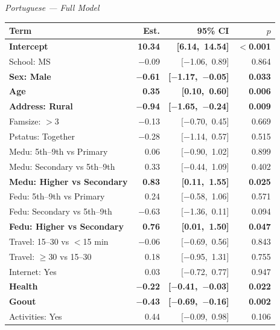 \documentclass{article}
\begin{document}
\hfill
\begin{minipage}[t]{0.49\textwidth}
\centering
\scriptsize
\textit{Portuguese --- Full Model}\\[4pt]
\begin{tabularx}{\textwidth}{Xrrr}
\toprule
\textbf{Term} & \textbf{Est.} & \textbf{95\% CI} & \textbf{$p$} \\
\midrule
\textbf{Intercept}            & \textbf{10.34} & \textbf{[6.14,\ 14.54]} & \textbf{$<$0.001} \\
School: MS                    & $-$0.09 & [$-$1.06,\ 0.89] & 0.864 \\
\textbf{Sex: Male}            & \textbf{$-$0.61} & \textbf{[$-$1.17,\ $-$0.05]} & \textbf{0.033} \\
\textbf{Age}                  & \textbf{0.35} & \textbf{[0.10,\ 0.60]} & \textbf{0.006} \\
\textbf{Address: Rural}       & \textbf{$-$0.94} & \textbf{[$-$1.65,\ $-$0.24]} & \textbf{0.009} \\
Famsize: $>$3                 & $-$0.13 & [$-$0.70,\ 0.45] & 0.669 \\
Pstatus: Together             & $-$0.28 & [$-$1.14,\ 0.57] & 0.515 \\
Medu: 5th--9th vs Primary     &  0.06 & [$-$0.90,\ 1.02] & 0.899 \\
Medu: Secondary vs 5th--9th   &  0.33 & [$-$0.44,\ 1.09] & 0.402 \\
\textbf{Medu: Higher vs Secondary} & \textbf{0.83} & \textbf{[0.11,\ 1.55]} & \textbf{0.025} \\
Fedu: 5th--9th vs Primary     &  0.24 & [$-$0.58,\ 1.06] & 0.571 \\
Fedu: Secondary vs 5th--9th   & $-$0.63 & [$-$1.36,\ 0.11] & 0.094 \\
\textbf{Fedu: Higher vs Secondary} & \textbf{0.76} & \textbf{[0.01,\ 1.50]} & \textbf{0.047} \\
Travel: 15--30 vs $<$15 min   & $-$0.06 & [$-$0.69,\ 0.56] & 0.843 \\
Travel: $\geq$30 vs 15--30    &  0.18 & [$-$0.95,\ 1.31] & 0.755 \\
Internet: Yes                 &  0.03 & [$-$0.72,\ 0.77] & 0.947 \\
\textbf{Health}               & \textbf{$-$0.22} & \textbf{[$-$0.41,\ $-$0.03]} & \textbf{0.022} \\
\textbf{Goout}                & \textbf{$-$0.43} & \textbf{[$-$0.69,\ $-$0.16]} & \textbf{0.002} \\
Activities: Yes               &  0.44 & [$-$0.09,\ 0.98] & 0.106 \\

\end{tabularx}
\end{minipage}
\end{document}
